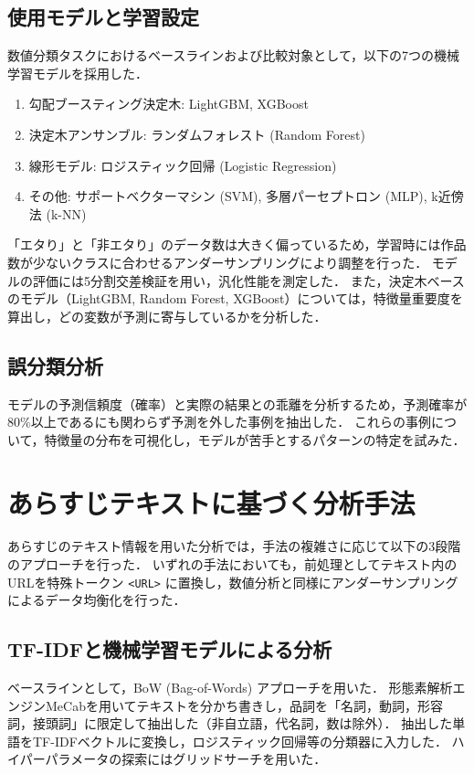 \documentclass[uplatex, dvipdfmx, 11pt, a4paper, report]{jsbook}
\begin{document}
\subsection{使用モデルと学習設定}
数値分類タスクにおけるベースラインおよび比較対象として，以下の7つの機械学習モデルを採用した．
\begin{enumerate}
  \item 勾配ブースティング決定木: LightGBM, XGBoost
  \item 決定木アンサンブル: ランダムフォレスト (Random Forest)
  \item 線形モデル: ロジスティック回帰 (Logistic Regression)
  \item その他: サポートベクターマシン (SVM), 多層パーセプトロン (MLP), k近傍法 (k-NN)
\end{enumerate}

「エタり」と「非エタり」のデータ数は大きく偏っているため，学習時には作品数が少ないクラスに合わせるアンダーサンプリングにより調整を行った．
モデルの評価には5分割交差検証を用い，汎化性能を測定した．
また，決定木ベースのモデル（LightGBM, Random Forest, XGBoost）については，特徴量重要度を算出し，どの変数が予測に寄与しているかを分析した．

\subsection{誤分類分析}
モデルの予測信頼度（確率）と実際の結果との乖離を分析するため，予測確率が80\%以上であるにも関わらず予測を外した事例を抽出した．
これらの事例について，特徴量の分布を可視化し，モデルが苦手とするパターンの特定を試みた．

\section{あらすじテキストに基づく分析手法}

あらすじのテキスト情報を用いた分析では，手法の複雑さに応じて以下の3段階のアプローチを行った．
いずれの手法においても，前処理としてテキスト内のURLを特殊トークン \texttt{<URL>} に置換し，数値分析と同様にアンダーサンプリングによるデータ均衡化を行った．

\subsection{TF-IDFと機械学習モデルによる分析}
ベースラインとして，BoW (Bag-of-Words) アプローチを用いた．
形態素解析エンジンMeCab\cite{mecab}を用いてテキストを分かち書きし，品詞を「名詞，動詞，形容詞，接頭詞」に限定して抽出した（非自立語，代名詞，数は除外）．
抽出した単語をTF-IDFベクトルに変換し，ロジスティック回帰等の分類器に入力した．
ハイパーパラメータの探索にはグリッドサーチを用いた．
\end{document}
